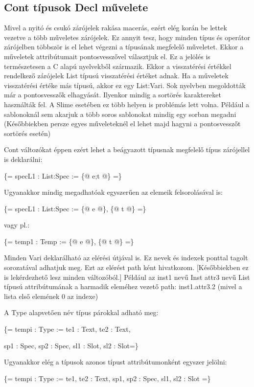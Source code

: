 \subsection{Cont típusok Decl művelete}
Mivel a nyitó és csukó zárójelek rakása macerás, ezért elég korán be lettek vezetve a több műveletes zárójelek.
Ez annyit tesz, hogy minden típus és operátor zárójelben többször is el lehet végezni a típusának megfelelő műveletet.
Ekkor a műveletek attribútumait pontosvesszővel választjuk el.
Ez a jelölés is természetesen a C alapú nyelvekből származik. 
Ekkor a visszatérési értékkel rendelkező zárójelek List típusú visszatérési értéket adnak.
Ha a műveletek visszatérési értéke más típusú, akkor ez egy List:Vari. 
Sok nyelvben megoldották már a pontosvesszők elhagyását.
Ilyenkor mindig a sortörés karaktereket használták fel.
A Slime  esetében ez több helyen is problémás lett volna.
Például a sablonoknál sem akarjuk a több soros sablonokat mindig egy sorban megadni
(Későbbiekben persze egyes műveleteknél el lehet majd hagyni a pontosvesszőt sortörés esetén)

Cont változókat éppen ezért lehet a beágyazott típusnak megfelelő típus zárójellel is deklarálni:

\{= specL1 : List:Spec := \{@ e;t @\} =\}

Ugyanakkor mindig megadhatóak egyszerűen az elemeik felsorolásával is:

\{= specL1 : List:Spec := \{@ e @\}, \{@ t @\} =\}

vagy pl.:

\{= temp1 : Temp := \{@ e @\}, \{@ t @\} =\}

Minden Vari deklarálható az elérési útjával is.
Ez nevek és indexek ponttal tagolt sorozatával adhatjuk meg.
Ezt az elérést path ként hivatkozom.
[Későbbiekben ez is lekérdezhető lesz minden változóból.]
Például az inst1 nevű Inst attr3 nevű List típusú attribútumának a harmadik eleméhez vezető path: inst1.attr3.2 
(mivel a lista első elemének 0 az indexe)

A Type alapvetően név típus párokkal adható meg:

\{= tempi : Type := te1 : Text, te2 : Text, 

sp1 : Spec, sp2 : Spec, sl1 : Slot, sl2 : Slot=\}

Ugyanakkor elég a típusok azonos típust attribútumonként egyszer jelölni:

\{= tempi : Type := te1, te2 : Text, sp1, sp2 : Spec, sl1, sl2 : Slot =\}


